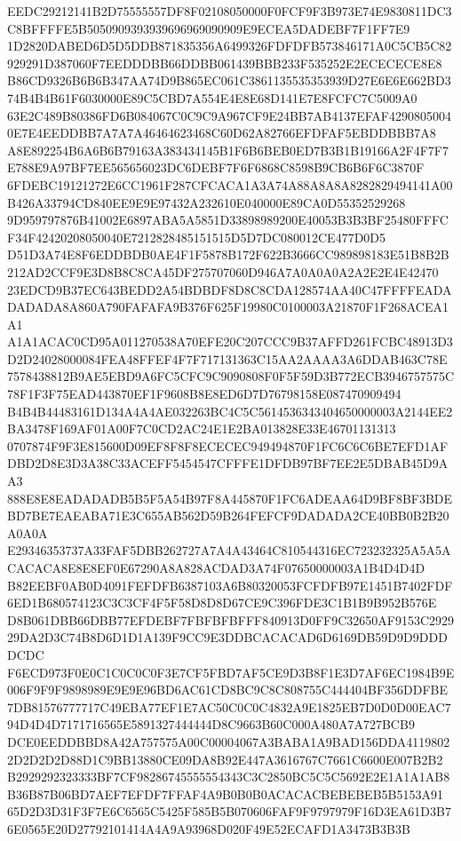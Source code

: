 \documentclass[UTF8,fontset=fandol,zihao=-4,a4paper]{ctexart}
\begin{document}
{{EEDC29212141B2D75555557DF8F02108050000F0FCF9F3B973E74E9830811DC3C8BFFFFE5B5050909393939696969090909E9ECEA5DADEBF7F1FF7E9
1D2820DABED6D5D5DDB871835356A6499326FDFDFB573846171A0C5CB5C82929291D387060F7EEDDDBB66DDBB061439BBB233F535252E2ECECECE8E8
B86CD9326B6B6B347AA74D9B865EC061C3861135535353939D27E6E6E662BD374B4B4B61F6030000E89C5CBD7A554E4E8E68D141E7E8FCFC7C5009A0
63E2C489B80386FD6B084067C0C9C9A967CF9E24BB7AB4137EFAF42908050040E7E4EEDDBB7A7A7A46464623468C60D62A82766EFDFAF5EBDDBBB7A8
A8E892254B6A6B6B79163A383434145B1F6B6BEB0ED7B3B1B19166A2F4F7F7E788E9A97BF7EE565656023DC6DEBF7F6F6868C8598B9CB6B6F6C3870F
6FDEBC19121272E6CC1961F287CFCACA1A3A74A88A8A8A8282829494141A00B426A33794CD840EE9E9E97432A232610E040000E89CA0D55352529268
9D959797876B41002E6897ABA5A5851D33898989200E40053B3B3BF25480FFFCF34F42420208050040E7212828485151515D5D7DC080012CE477D0D5
D51D3A74E8F6EDDBDB0AE4F1F5878B172F622B3666CC989898183E51B8B2B212AD2CCF9E3D8B8C8CA45DF275707060D946A7A0A0A0A2A2E2E4E42470
23EDCD9B37EC643BEDD2A54BDBDF8D8C8CDA128574AA40C47FFFFEADADADADA8A860A790FAFAFA9B376F625F19980C0100003A21870F1F268ACEA1A1
A1A1ACAC0CD95A011270538A70EFE20C207CCC9B37AFFD261FCBC48913D3D2D24028000084FEA48FFEF4F7F717131363C15AA2AAAA3A6DDAB463C78E
7578438812B9AE5EBD9A6FC5CFC9C9090808F0F5F59D3B772ECB3946757575C78F1F3F75EAD443870EF1F9608B8E8ED6D7D76798158E087470909494
B4B4B44483161D134A4A4AE032263BC4C5C5614536343404650000003A2144EE2BA3478F169AF01A00F7C0CD2AC24E1E2BA013828E33E46701131313
0707874F9F3E815600D09EF8F8F8ECECEC949494870F1FC6C6C6BE7EFD1AFDBD2D8E3D3A38C33ACEFF5454547CFFFE1DFDB97BF7EE2E5DBAB45D9AA3
888E8E8EADADADB5B5F5A54B97F8A445870F1FC6ADEAA64D9BF8BF3BDEBD7BE7EAEABA71E3C655AB562D59B264FEFCF9DADADA2CE40BB0B2B20A0A0A
E29346353737A33FAF5DBB262727A7A4A43464C810544316EC723232325A5A5ACACACA8E8E8EF0E67290A8A828ACDAD3A74F07650000003A1B4D4D4D
B82EEBF0AB0D4091FEFDFB6387103A6B80320053FCFDFB97E1451B7402FDF6ED1B680574123C3C3CF4F5F58D8D8D67CE9C396FDE3C1B1B9B952B576E
D8B061DBB66DBB77EFDEBF7FBFBFBFFF840913D0FF9C32650AF9153C292929DA2D3C74B8D6D1D1A139F9CC9E3DDBCACACAD6D6169DB59D9D9DDDDCDC
F6ECD973F0E0C1C0C0C0F3E7CF5FBD7AF5CE9D3B8F1E3D7AF6EC1984B9E006F9F9F9898989E9E9E96BD6AC61CD8BC9C8C808755C444404BF356DDFBE
7DB81576777717C49EBA77EF1E7AC50C0C0C4832A9E1825EB7D0D0D00EAC794D4D4D7171716565E5891327444444D8C9663B60C000A480A7A727BCB9
DCE0EEDDBBD8A42A757575A00C00004067A3BABA1A9BAD156DDA41198022D2D2D2D88D1C9BB13880CE09DA8B92E447A3616767C7661C6600E007B2B2
B2929292323333BF7CF98286745555554343C3C2850BC5C5C5692E2E1A1A1AB8B36B87B06BD7AEF7EFDF7FFAF4A9B0B0B0ACACACBEBEBEB5B5153A91
65D2D3D31F3F7E6C6565C5425F585B5B070606FAF9F9797979F16D3EA61D3B76E0565E20D27792101414A4A9A93968D020F49E52ECAFD1A3473B3B3B
}}
\end{document}
